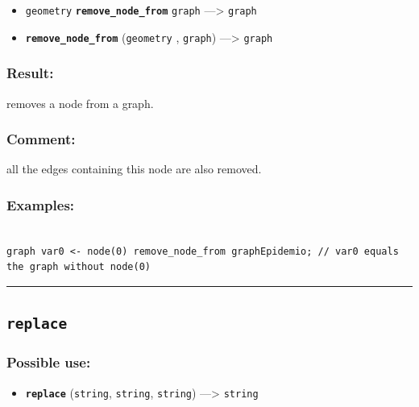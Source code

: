 \documentclass[]{book}
\providecommand{\tightlist}{%
  \setlength{\itemsep}{0pt}\setlength{\parskip}{0pt}}
\theoremstyle{definition}
\theoremstyle{definition}
\theoremstyle{definition}
\theoremstyle{remark}
\begin{document}
\begin{itemize}
\tightlist
\item
  \texttt{geometry} \textbf{\texttt{remove\_node\_from}} \texttt{graph}
  ---\textgreater{} \texttt{graph}
\item
  \textbf{\texttt{remove\_node\_from}} (\texttt{geometry} ,
  \texttt{graph}) ---\textgreater{} \texttt{graph}
\end{itemize}

\subsubsection{Result:}\label{result-418}

removes a node from a graph.

\subsubsection{Comment:}\label{comment-82}

all the edges containing this node are also removed.

\subsubsection{Examples:}\label{examples-296}

\begin{verbatim}
 
graph var0 <- node(0) remove_node_from graphEpidemio; // var0 equals the graph without node(0)
\end{verbatim}

\begin{center}\rule{0.5\linewidth}{\linethickness}\end{center}

\subsection{\texorpdfstring{\texttt{replace}}{replace}}\label{replace}

\subsubsection{Possible use:}\label{possible-use-433}

\begin{itemize}
\tightlist
\item
  \textbf{\texttt{replace}} (\texttt{string}, \texttt{string},
  \texttt{string}) ---\textgreater{} \texttt{string}
\end{itemize}
\end{document}
